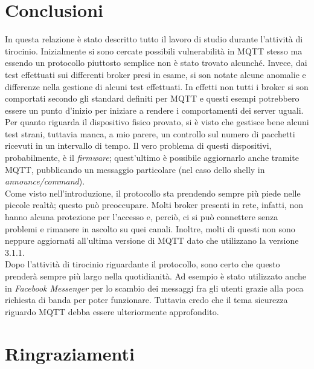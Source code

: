 \documentclass[binding=0.6cm,TFA]{sapthesis}
\begin{document}
\chapter{Conclusioni}

\begin{large}
In questa relazione è stato descritto tutto il lavoro di studio durante l'attività di tirocinio. Inizialmente si sono cercate possibili vulnerabilità in MQTT stesso ma essendo un protocollo piuttosto semplice non è stato trovato alcunché. Invece, dai test effettuati sui differenti broker presi in esame, si son notate alcune anomalie e differenze nella gestione di alcuni test effettuati. In effetti non tutti i broker si son comportati secondo gli standard definiti per MQTT e questi esempi potrebbero essere un punto d'inizio per iniziare a rendere i comportamenti dei server uguali. \\
Per quanto riguarda il dispositivo fisico provato, si è visto che gestisce bene alcuni test strani, tuttavia manca, a mio parere, un controllo sul numero di pacchetti ricevuti in un intervallo di tempo. Il vero problema di questi dispositivi, probabilmente, è il \textit{firmware}; quest'ultimo è possibile aggiornarlo anche tramite MQTT, pubblicando un messaggio particolare (nel caso dello shelly in \textit{announce/command}). \\
Come visto nell'introduzione, il protocollo sta prendendo sempre più piede nelle piccole realtà; questo può preoccupare. Molti broker presenti in rete, infatti, non hanno alcuna protezione per l'accesso e, perciò, ci si può connettere senza problemi e rimanere in ascolto su quei canali. Inoltre, molti di questi non sono neppure aggiornati all'ultima versione di MQTT dato che utilizzano la versione 3.1.1. \\

Dopo l'attività di tirocinio riguardante il protocollo, sono certo che questo prenderà sempre più largo nella quotidianità. Ad esempio è stato utilizzato anche in \textit{Facebook Messenger} per lo scambio dei messaggi fra gli utenti grazie alla poca richiesta di banda per poter funzionare. Tuttavia credo che il tema sicurezza riguardo MQTT debba essere ulteriormente approfondito.
\end{large}

\chapter*{Ringraziamenti}

\cleardoublepage
{}
\end{document}
